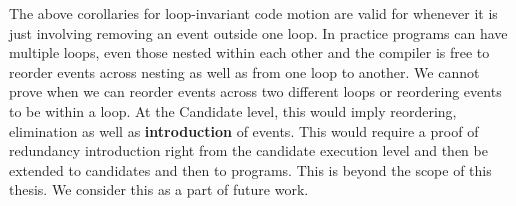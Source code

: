                The above corollaries for loop-invariant code motion are valid for whenever it is just involving removing an event outside one loop. 
                In practice programs can have multiple loops, even those nested within each other and the compiler is free to reorder events across nesting as well as from one loop to another.
                We cannot prove when we can reorder events across two different loops or reordering events to be within a loop.
                At the Candidate level, this would imply reordering, elimination as well as \textbf{introduction} of events. 
                This would require a proof of redundancy introduction right from the candidate execution level and then be extended to candidates and then to programs. 
                This is beyond the scope of this thesis. We consider this as a part of future work. 
